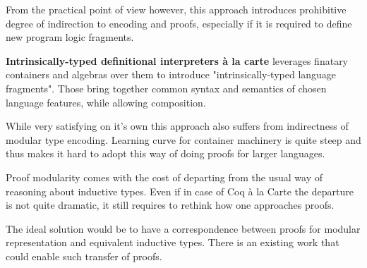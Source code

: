 \documentclass[sigplan,nonacm]{acmart}
\begin{document}
From the practical point of view however, this approach introduces prohibitive degree of indirection to encoding and proofs, especially if it is required to define new program logic fragments.



\medskip
\textbf{Intrinsically-typed definitional interpreters {\`a} la carte}\cite{van2022intrinsically} leverages finatary containers\cite{altenkirch2015indexed} and algebras over them to introduce "intrinsically-typed language fragments".
Those bring together common syntax and semantics of chosen language features, while allowing composition. 

While very satisfying on it's own this approach also suffers from indirectness of modular type encoding. Learning curve for container machinery is quite steep and thus makes it hard to adopt this way of doing proofs for larger languages.




\medskip


Proof modularity comes with the cost of departing from the usual way of reasoning about inductive types. 
Even if in case of Coq à la Carte the departure is not quite dramatic, it still requires to rethink how one approaches proofs.

The ideal solution would be to have a correspondence between proofs for modular representation and equivalent inductive types. 
There is an existing work\cite{cohen2024trocq} that could enable such transfer of proofs. 







\appendix
\end{document}
